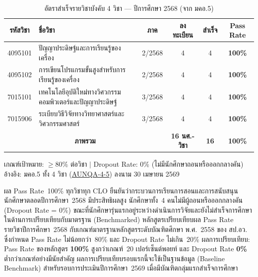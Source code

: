 \begin{table}[H]
  \centering
  \caption{อัตราสำเร็จรายวิชาบังคับ 4 วิชา --- ปีการศึกษา 2568 (จาก มคอ.5)}
  \label{tbl:course_pass_rate_2568}
  \begingroup
  \footnotesize
  \setlength{\tabcolsep}{3pt}
  \renewcommand{\arraystretch}{1.3}
  \begin{tabularx}{\linewidth}{|c|>{\raggedright\arraybackslash}X|c|c|c|c|}
    \hline
    \textbf{รหัสวิชา} & \textbf{ชื่อวิชา} & \textbf{ภาค} & \textbf{ลงทะเบียน} & \textbf{สำเร็จ} & \textbf{Pass Rate} \\
    \hline
    4095101 & ปัญญาประดิษฐ์และการเรียนรู้ของเครื่อง & 2/2568 & 4 & 4 & \textbf{100\%} \\
    \hline
    4095102 & การเขียนโปรแกรมขั้นสูงสำหรับการเรียนรู้ของเครื่อง & 2/2568 & 4 & 4 & \textbf{100\%} \\
    \hline
    7015101 & เทคโนโลยีอุบัติใหม่ทางวิศวกรรมคอมพิวเตอร์และปัญญาประดิษฐ์ & 3/2568 & 4 & 4 & \textbf{100\%} \\
    \hline
    7015906 & ระเบียบวิธีวิจัยทางวิทยาศาสตร์และวิศวกรรมศาสตร์ & 3/2568 & 4 & 4 & \textbf{100\%} \\
    \hline
    \multicolumn{3}{|c|}{\textbf{ภาพรวม}} & \textbf{16 นศ.-วิชา} & \textbf{16} & \textbf{100\%} \\
    \hline
  \end{tabularx}
  \endgroup
  \begin{flushleft}
    \footnotesize เกณฑ์เป้าหมาย: $\geq$80\% ต่อวิชา $|$ Dropout Rate: 0\% (ไม่มีนักศึกษาถอนหรือออกกลางคัน) \\
    อ้างอิง: มคอ.5 ทั้ง 4 วิชา (\hyperlink{ref:AUNQA-4-5}{AUNQA-4-5}) ลงนาม 30 เมษายน 2569
  \end{flushleft}
\end{table}

ผล Pass Rate~100\% ทุกวิชาทุก CLO ยืนยันว่ากระบวนการเรียนการสอนและการสนับสนุนนักศึกษาตลอดปีการศึกษา~2568 มีประสิทธิผลสูง นักศึกษาทั้ง~4 คนไม่มีผู้ถอนหรือออกกลางคัน (Dropout Rate = 0\%) ขณะที่นักศึกษารุ่นแรกอยู่ระหว่างดำเนินการวิจัยและยังไม่สำเร็จการศึกษา ในด้านการเปรียบเทียบกับมาตรฐาน (Benchmarked) หลักสูตรเปรียบเทียบผล Pass Rate รายวิชาปีการศึกษา~2568 กับเกณฑ์มาตรฐานหลักสูตรระดับบัณฑิตศึกษา พ.ศ.~2558 ของ สป.อว. ซึ่งกำหนด Pass Rate ไม่น้อยกว่า~80\% และ Dropout Rate ไม่เกิน~20\% ผลการเปรียบเทียบ: Pass Rate ของหลักสูตร \textbf{100\%} สูงกว่าเกณฑ์~20 เปอร์เซ็นต์พอยท์ และ Dropout Rate \textbf{0\%} ต่ำกว่าเกณฑ์อย่างมีนัยสำคัญ ผลการเปรียบเทียบรอบแรกนี้จะใช้เป็นฐานข้อมูล (Baseline Benchmark) สำหรับรอบการประเมินปีการศึกษา~2569 เมื่อมีบัณฑิตกลุ่มแรกสำเร็จการศึกษา

